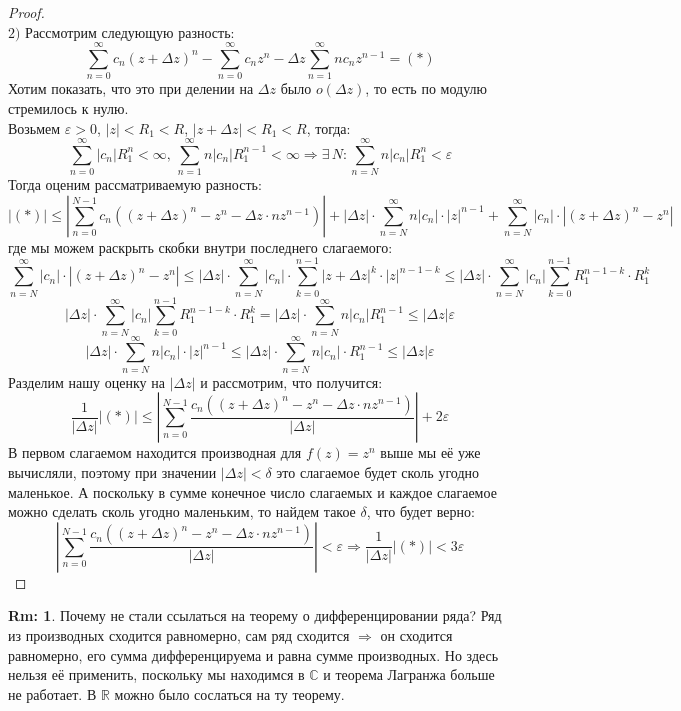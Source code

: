 \documentclass[12pt]{article}
\newcommand{\MR}{\mathbb{R}}
\newcommand{\MC}{\mathbb{C}}
\newcommand{\VE}{\varepsilon}
\theoremstyle{definition}
\newtheorem{rem}{Rm:}
\newcommand{\ddsum}[2]{\displaystyle\sum\limits_{#1}^{#2}}
\begin{document}
\begin{proof}\hfill\\
	$2)$ Рассмотрим следующую разность:
	$$
		\ddsum{n = 0}{\infty}c_n(z + \Delta z)^n - \ddsum{n = 0}{\infty}c_n z^n - \Delta z \ddsum{n = 1}{\infty}nc_n z^{n-1} = (*)
	$$
	Хотим показать, что это при делении на $\Delta z$ было $o(\Delta z)$, то есть по модулю стремилось к нулю. \\ Возьмем $\VE >  0$, $|z| < R_1 < R$, $|z + \Delta z| < R_1 < R$, тогда:
	$$
		\ddsum{n = 0}{\infty}|c_n|R_1^{n} < \infty, \, \ddsum{n = 1}{\infty}n|c_n|R_1^{n-1} < \infty \Rightarrow \exists \, N \colon \ddsum{n = N}{\infty}n|c_n|R_1^n < \VE
	$$
	Тогда оценим рассматриваемую разность:
	$$
		|(*)| \leq \left|\ddsum{n = 0}{N-1}c_n\left((z + \Delta z)^n - z^n - \Delta z{\cdot} n z^{n-1} \right)  \right| + |\Delta z|{\cdot}\ddsum{n = N}{\infty}n|c_n|{\cdot}|z|^{n-1} + \ddsum{n = N}{\infty}|c_n|{\cdot}|(z + \Delta z)^n - z^n|
	$$
	где мы можем раскрыть скобки внутри последнего слагаемого:
	$$
		\ddsum{n = N}{\infty}|c_n|{\cdot}|(z + \Delta z)^n - z^n| \leq |\Delta z| {\cdot} \ddsum{n = N}{\infty}|c_n|{\cdot}\ddsum{k = 0}{n - 1}|z + \Delta z|^k{\cdot}|z|^{n - 1 - k} \leq |\Delta z|{\cdot} \ddsum{n = N}{\infty}|c_n| \ddsum{k = 0}{n-1}R_1^{n-1 -k}{\cdot}R_1^k
	$$
	$$
		|\Delta z|{\cdot} \ddsum{n = N}{\infty}|c_n| \ddsum{k = 0}{n-1}R_1^{n-1 -k}{\cdot}R_1^k = |\Delta z| {\cdot}\ddsum{n = N}{\infty}n|c_n| R_1^{n-1} \leq |\Delta z| \VE
	$$
	$$
		|\Delta z|{\cdot}\ddsum{n = N}{\infty}n|c_n|{\cdot}|z|^{n-1}  \leq |\Delta z| {\cdot}\ddsum{n = N}{\infty}n|c_n|{\cdot}R_1^{n-1} \leq |\Delta z| \VE
	$$
	Разделим нашу оценку на $|\Delta z|$ и рассмотрим, что получится:
	$$
		\dfrac{1}{|\Delta z|}|(*)| \leq \left|\ddsum{n = 0}{N-1}\dfrac{c_n\left((z + \Delta z)^n - z^n - \Delta z{\cdot} n z^{n-1} \right)}{|\Delta z|}  \right| + 2\VE
	$$ 
	В первом слагаемом находится производная для $f(z) = z^n$ выше мы её уже вычисляли, поэтому при значении $|\Delta z| < \delta$ это слагаемое будет сколь угодно маленькое. А поскольку в сумме конечное число слагаемых и каждое слагаемое можно сделать сколь угодно маленьким, то найдем такое $\delta$, что будет верно:
	$$
		\left|\ddsum{n = 0}{N-1}\dfrac{c_n\left((z + \Delta z)^n - z^n - \Delta z{\cdot} n z^{n-1} \right)}{|\Delta z|}  \right| < \VE \Rightarrow \dfrac{1}{|\Delta z|}|(*)| < 3\VE
	$$
\end{proof}

\begin{rem}
	Почему не стали ссылаться на теорему о дифференцировании ряда? Ряд из производных сходится равномерно, сам ряд сходится $\Rightarrow$ он сходится равномерно, его сумма дифференцируема и равна сумме производных. Но здесь нельзя её применить, поскольку мы находимся в $\MC$ и теорема Лагранжа больше не работает. В $\MR$ можно было сослаться на ту теорему.
\end{rem}
\end{document}
